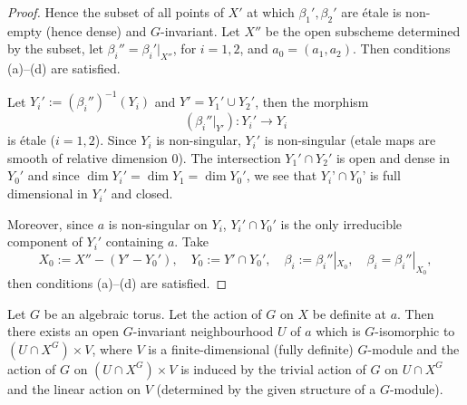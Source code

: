 \documentclass[12pt]{article}
\begin{document}
\begin{proof}
Hence the subset of all points of $X'$ at which $\beta_1', \beta_2'$ are \'etale is non-empty (hence dense) and $G$-invariant. Let $X''$ be the open subscheme determined by the subset, let $\beta_i'' = \beta_i'|_{X''}$, for $i=1,2$, and $a_0=(a_1,a_2)$. Then conditions (a)--(d) are satisfied.

\medskip

Let $Y_i' := (\beta_i'')^{-1}(Y_i)$ and $Y' = Y_1' \cup Y_2'$, then the morphism 
\[
   (\beta_i''|_{Y'}) : Y_i' \to Y_i
\]
is \'etale ($i=1,2$). Since $Y_i$ is non-singular, $Y_i'$ is non-singular (etale maps are smooth of relative dimension 0). The intersection $Y_1' \cap Y_2'$ is open and dense in $Y_0'$ and since $\dim Y_i' = \dim Y_1 = \dim Y_0'$, we see that $Y_i’ \cap Y_0’$ is full dimensional in $Y_i'$ and closed. 

Moreover, since $a$ is non-singular on $Y_i$, $Y_i'\cap Y_0'$ is the only irreducible component of $Y_i'$ containing $a$. Take
\[
   X_0 := X'' - (Y' - Y_0'), \quad Y_0 := Y' \cap Y_0', \quad \beta_i := \beta_i''|_{X_0}, \quad \beta_i = \beta_i''|_{X_0},
\]
then conditions (a)--(d) are satisfied.
\end{proof}

\begin{theorem}[2.5]
Let $G$ be an algebraic torus. Let the action of $G$ on $X$ be definite at $a$. Then there exists an open $G$-invariant neighbourhood $U$ of $a$ which is $G$-isomorphic to $(U \cap X^G) \times V$, where $V$ is a finite-dimensional (fully definite) $G$-module and the action of $G$ on $(U \cap X^G) \times V$ is induced by the trivial action of $G$ on $U \cap X^G$ and the linear action on $V$ (determined by the given structure of a $G$-module).
\end{theorem}
\end{document}
